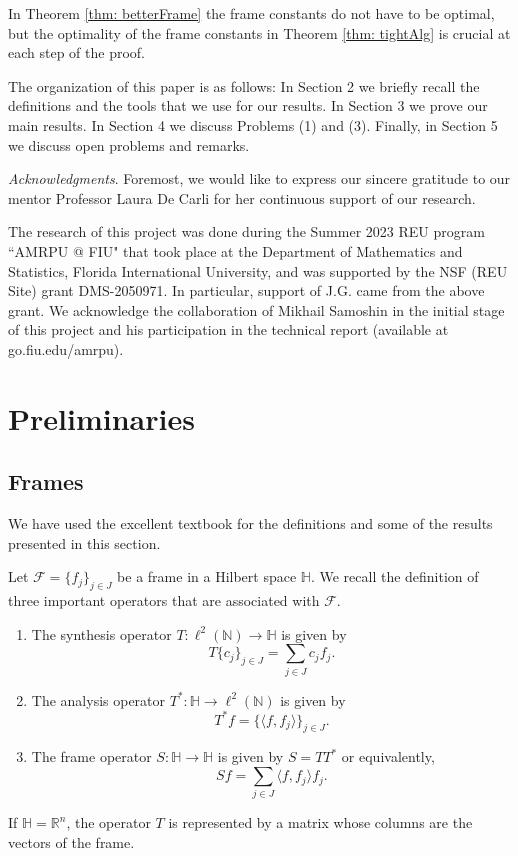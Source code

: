 \documentclass[11pt, reqno]{amsart}
\providecommand{\N}{\mathbb N}
\renewcommand{\H}{\mathbb{H}}
\providecommand{\R}{\mathbb R}
\numberwithin{equation}{section}
\begin{document}
In Theorem \ref{thm: betterFrame} the frame constants do not have to be optimal, but the optimality of the frame constants in Theorem \ref{thm: tightAlg} is crucial at each step of the proof.  
 
  




\medskip

The organization of this paper is as follows: In Section 2 we briefly recall the definitions and the tools that we use for our results. In Section 3 we prove our main results. In Section 4 we discuss Problems (1) and  (3). Finally, in Section 5 we discuss open problems and remarks. 

\medskip
\noindent
{\it Acknowledgments}. Foremost, we would like to express our sincere gratitude to our mentor Professor Laura De Carli for her continuous support of our research.

The research of this project was done during the Summer 2023 REU program ``AMRPU @ FIU" that took place at the Department of Mathematics and Statistics, Florida International University, and was supported by the NSF (REU Site) grant DMS-2050971. In particular, support of J.G. came from the above grant. We acknowledge the collaboration of Mikhail Samoshin in the initial stage of this project and his participation in the technical report (available at go.fiu.edu/amrpu).


\section{Preliminaries}

\subsection{Frames}

We have used the excellent textbook \cite{Christensen} for the definitions and some of the results presented in this section.
	
Let  ${\mathcal F}=\{f_j\}_{j\in J}$ be a frame in a Hilbert space ${\mathbb{H}}$. 
We recall the definition of three important operators that are associated with  ${\mathcal F}$.

    \begin{enumerate}
        \item The synthesis operator $T: \ell^2(\N) \to \mathbb{H}$ is given by $$T\{c_j\}_{j \in J} = \sum_{j \in J}c_jf_j.$$

        \item The analysis operator $T^*: \mathbb{H}\to\ell^2(\N)$ is given by $$T^*f= \{\langle f, f_j\rangle\}_{j \in J}.$$

        \item The frame operator $S:\mathbb{H}\to \mathbb{H}$ is given by $S=TT^*$ or equivalently, $$Sf = \sum_{j \in J}\langle f, f_j\rangle f_j.$$
    \end{enumerate}
If $ \H=\R^n$, the operator $T$ is represented by a matrix whose columns are the vectors of the frame. 
\end{document}

